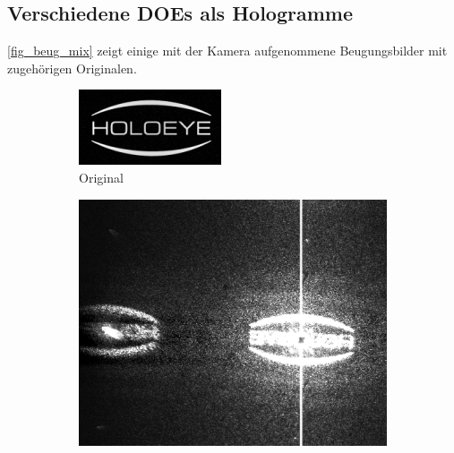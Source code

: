 \documentclass[
	a4paper,
	12pt,
	pagesize,
	ngerman
]{scrartcl}
\begin{document}
		\subsection{Verschiedene DOEs als Hologramme}
 		\cref{fig_beug_mix} zeigt einige mit der Kamera aufgenommene Beugungsbilder mit zugehörigen Originalen.
\begin{figure}[H] %
        \centering
        \begin{subfigure}[b]{0.300\textwidth}
            \centering
            \includegraphics[width=\textwidth]{raw/holoeye_org}
            \caption%
            {Original}
            \label{fig_holoeye_org}
        \end{subfigure}
				\quad
        \begin{subfigure}[b]{0.475\textwidth}
            \centering
            \includegraphics[width=\textwidth]{raw/holoeye}

\end{subfigure}
\end{figure}
\end{document}

